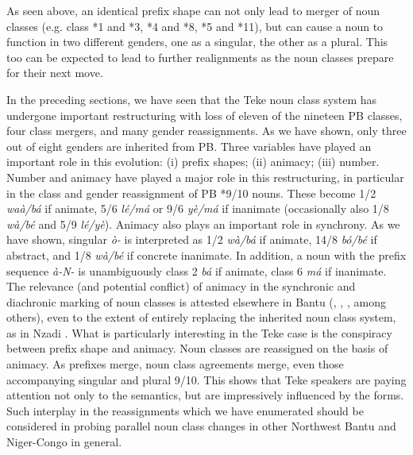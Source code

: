 \documentclass[output=paper,,modfonts,nonflat]{langsci/langscibook}
\begin{document}
As seen above, an identical prefix shape can not only lead to merger of noun classes (e.g. class *1 and *3, *4 and *8, *5 and *11), but can cause a noun to function in two different genders, one as a singular, the other as a plural. This too can be expected to lead to further realignments as the noun classes prepare for their next move.

In the preceding sections, we have seen that the Teke noun class system has undergone important restructuring with loss of eleven of the nineteen PB classes, four class mergers, and many gender reassignments. As we have shown, only three out of eight genders are inherited from PB. Three variables have played an important role in this evolution: (i) prefix shapes; (ii) animacy; (iii) number. Number and animacy have played a major role in this restructuring, in particular in the class and gender reassignment of PB *9/10 nouns. These become 1/2 \textit{waà/bá} if animate, 5/6 \textit{lé/má} or 9/6 \textit{yè/má} if inanimate (occasionally also 1/8 \textit{wà/bé} and 5/9 \textit{lé/yè}). Animacy also plays an important role in synchrony. As we have shown, singular \textit{ò-} is interpreted as 1/2 \textit{wà/bá} if animate, 14/8 \textit{bó/bé} if abstract, and 1/8 \textit{wà/bé} if concrete inanimate. In addition, a noun with the prefix sequence \textit{à-N-} is unambiguously class 2 \textit{bá} if animate, class 6 \textit{má} if inanimate. The relevance (and potential conflict) of animacy in the synchronic and diachronic marking of noun classes is attested elsewhere in Bantu (\cite{Wald1975}, \cite{Maho1999}, \cite{Contini2008}, among others), even to the extent of entirely replacing the inherited noun class system, as in Nzadi \citep{Craneetal2011}. What is particularly interesting in the Teke case is the conspiracy between prefix shape and animacy. Noun classes are reassigned on the basis of animacy. As prefixes merge, noun class agreements merge, even those accompanying singular and plural 9/10. This shows that Teke speakers are paying attention not only to the semantics, but are impressively influenced by the forms. Such interplay in the reassignments which we have enumerated should be considered in probing parallel noun class changes in other Northwest Bantu and Niger-Congo in general.


\sloppy
\printbibliography[heading=subbibliography,notkeyword=this]
\end{document}
